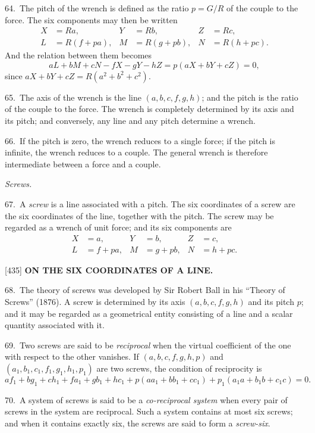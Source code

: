 \documentclass[12pt,a4paper]{article}
\newcommand{\paperref}[1]{\textup{[#1]}}
\theoremstyle{definition}
\begin{document}
64.~The pitch of the wrench is defined as the ratio $p = G/R$ of the couple to the force. The six components may then be written
\begin{align*}
X &= R a, & Y &= R b, & Z &= R c,\\
L &= R(f + pa), & M &= R(g + pb), & N &= R(h + pc).
\end{align*}
And the relation between them becomes
\[
a L + b M + c N - f X - g Y - h Z = p(a X + b Y + c Z) = 0,
\]
since $a X + b Y + c Z = R(a^2 + b^2 + c^2)$.

65.~The axis of the wrench is the line $(a, b, c, f, g, h)$; and the pitch is the ratio of the couple to the force. The wrench is completely determined by its axis and its pitch; and conversely, any line and any pitch determine a wrench.

66.~If the pitch is zero, the wrench reduces to a single force; if the pitch is infinite, the wrench reduces to a couple. The general wrench is therefore intermediate between a force and a couple.

\textit{Screws.}

67.~A \textit{screw} is a line associated with a pitch. The six coordinates of a screw are the six coordinates of the line, together with the pitch. The screw may be regarded as a wrench of unit force; and its six components are
\begin{align*}
X &= a, & Y &= b, & Z &= c,\\
L &= f + pa, & M &= g + pb, & N &= h + pc.
\end{align*}

\newpage
\setcounter{page}{91}

\noindent\paperref{435}\quad
\textbf{ON THE SIX COORDINATES OF A LINE.}

68.~The theory of screws was developed by Sir Robert Ball in his ``Theory of Screws'' (1876). A screw is determined by its axis $(a, b, c, f, g, h)$ and its pitch $p$; and it may be regarded as a geometrical entity consisting of a line and a scalar quantity associated with it.

69.~Two screws are said to be \textit{reciprocal} when the virtual coefficient of the one with respect to the other vanishes. If $(a, b, c, f, g, h, p)$ and $(a_1, b_1, c_1, f_1, g_1, h_1, p_1)$ are two screws, the condition of reciprocity is
\[
a f_1 + b g_1 + c h_1 + f a_1 + g b_1 + h c_1 + p(a a_1 + b b_1 + c c_1) + p_1(a_1 a + b_1 b + c_1 c) = 0.
\]

70.~A system of screws is said to be a \textit{co-reciprocal system} when every pair of screws in the system are reciprocal. Such a system contains at most six screws; and when it contains exactly six, the screws are said to form a \textit{screw-six}.
\end{document}
